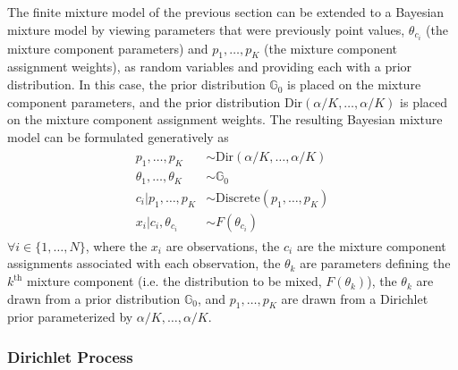 \documentclass[twocolumn, final]{svjour3}
\begin{document}
The finite mixture model of the previous section can be extended to a Bayesian mixture model by viewing parameters that were previously point values, $\theta_{c_{i}}$ (the mixture component parameters) and $p_{1}, \ldots, p_{K}$ (the mixture component assignment weights), as random variables and providing each with a prior distribution. In this case, the prior distribution $\mathbb{G}_{0}$ is placed on the mixture component parameters, and the prior distribution $\text{Dir}(\alpha/K, \ldots, \alpha/K)$ is placed on the mixture component assignment weights. The resulting Bayesian mixture model can be formulated generatively as
\begin{align}
\begin{split}
\label{bayesian_mixture_model}
	p_{1}, \ldots, p_{K}  &\sim  \text{Dir}(\alpha/K, \ldots, \alpha/K)\\
	\theta_{1}, \ldots, \theta_{K}  &\sim  \mathbb{G}_{0} \\
	c_{i}|p_{1}, \ldots, p_{K}  &\sim  \text{Discrete}(p_{1}, \ldots, p_{K}) \\
	x_{i}|c_{i}, \theta_{c_{i}}  &\sim  F(\theta_{c_{i}})
\end{split}
\end{align}
$\forall i \in \{ 1, \ldots, N \}$, where the $x_{i}$ are observations, the $c_{i}$ are the mixture component assignments associated with each observation, the $\theta_{k}$ are parameters defining the $k^{\text{th}}$ mixture component (i.e. the distribution to be mixed, $F(\theta_{k})$), the $\theta_{k}$ are drawn from a prior distribution $\mathbb{G}_{0}$, and $p_{1}, \ldots, p_{K}$ are drawn from a Dirichlet prior parameterized by $\alpha/K, \ldots, \alpha/K$.






\subsubsection{Dirichlet Process}
\label{sec:dirichlet_process}

\end{document}

